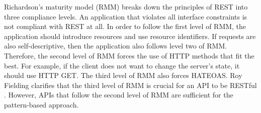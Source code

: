 Richardson's maturity model (RMM) \cite{martin_fowler_richardson_maturity_model} breaks down the principles of REST into three compliance levels. 
An application that violates all interface constraints is not compliant with REST at all. In order to follow the first level of RMM, the application should introduce resources and use resource identifiers. If requests are also self-descriptive, then the application also follows level two of RMM. Therefore, the second level of RMM forces the use of HTTP methods that fit the best. For example, if the client does not want to change the server's state, it should use HTTP GET. The third level of RMM also forces HATEOAS.
Roy Fielding clarifies that the third level of RMM is crucial for an API to be RESTful \cite{Fielding_REST_APIs_must_be_hypertext_driven}. 
However, APIs that follow the second level of RMM are sufficient for the pattern-based approach.

